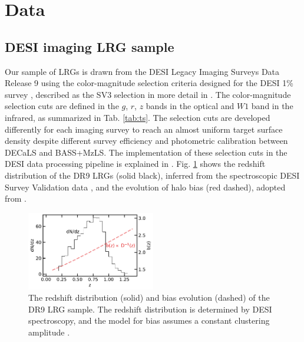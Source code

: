 \section{Data}
\label{sec:data}

\subsection{DESI imaging LRG sample}
Our sample of LRGs is drawn from the DESI Legacy Imaging Surveys Data Release 9 \citep[DR9;][]{dey2018overview} using the color-magnitude selection criteria designed for the DESI 1\% survey , described as the SV3 selection in more detail in \cite{zhou2022target}. The color-magnitude selection cuts are defined in the $g$, $r$, $z$ bands in the optical and $W1$ band in the infrared, as summarized in Tab. \ref{tab:ts}. The selection cuts are developed differently for each imaging survey to reach an almost uniform target surface density despite different survey efficiency and photometric calibration between DECaLS and BASS+MzLS. The implementation of these selection cuts in the DESI data processing pipeline is explained in \cite{myers2022}. Fig. \ref{fig:nz} shows the redshift distribution of the DR9 LRGs (solid black), inferred from the spectroscopic DESI Survey Validation data , and the evolution of halo bias (red dashed), adopted from \cite{zhou2021clustering}.

\begin{figure}
 \centering
 \includegraphics[width=0.5\textwidth]{figures/nz_lrg.pdf}
 \caption{The redshift distribution (solid) and bias evolution (dashed) of the DR9 LRG sample. The redshift distribution is determined by DESI spectroscopy, and the model for bias assumes a constant clustering amplitude \citep[see, e.g.,][]{zhou2021clustering, zhou2022target}.}
 \label{fig:nz}
\end{figure}

